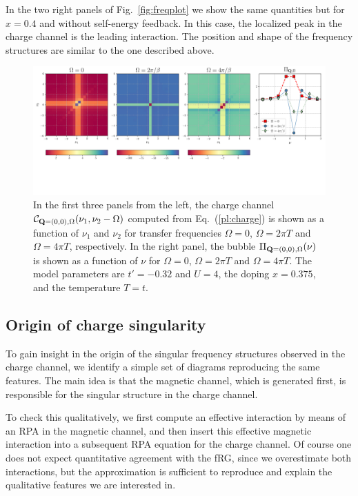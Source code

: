 In the two right panels of Fig.~\ref{fig:freqplot} we show the same quantities but for $x=0.4$ and without self-energy feedback. In this case, the localized peak in the charge channel is the leading interaction. The position and shape of the frequency structures are similar to the one described above.

\begin{figure}
\includegraphics[width=\textwidth]{images/PL_all.png}
\vspace*{-2.0cm}
\caption{In the first three panels from the left, the charge channel $\mathcal{C}_{\mathbf{Q}=(0,0),\Omega}(\nu_1,\nu_2-\Omega)$ computed from Eq.~(\ref{pl:charge}) is shown as a function of $\nu_1$ and $\nu_2$ for transfer frequencies $\Omega=0$, $\Omega=2\pi T$ and $\Omega=4\pi T$, respectively. In the right panel, the bubble $\Pi_{\mathbf{Q}=(0,0),\Omega}(\nu)$ is shown as a function of $\nu$ for $\Omega=0$, $\Omega=2\pi T$ and $\Omega=4\pi T$. The model parameters are $t'=-0.32$ and $U=4$, the doping $x=0.375$, and the temperature $T=t$.} 
\label{fig:perpladder}
\end{figure}

\subsection{Origin of charge singularity} 
\label{sec:PerpLadder}
To gain insight in the origin of the singular frequency structures observed in the charge channel, we identify a simple set of diagrams reproducing the same features.   
The main idea is that the magnetic channel, which is generated first, is responsible for the singular structure in the charge channel. 

To check this qualitatively, we first compute an effective interaction by means of an RPA in the magnetic channel, and then insert this effective magnetic interaction into a subsequent RPA equation for the charge channel. 
Of course one does not expect quantitative agreement with the fRG, since we overestimate both interactions, but the approximation is sufficient to reproduce and explain the qualitative features we are interested in.  
  
